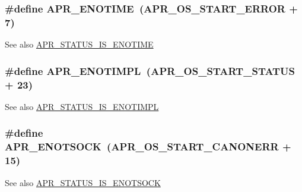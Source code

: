 \subsubsection[{\texorpdfstring{A\+P\+R\+\_\+\+E\+N\+O\+T\+I\+ME}{APR_ENOTIME}}]{\setlength{\rightskip}{0pt plus 5cm}\#define A\+P\+R\+\_\+\+E\+N\+O\+T\+I\+ME~({\bf A\+P\+R\+\_\+\+O\+S\+\_\+\+S\+T\+A\+R\+T\+\_\+\+E\+R\+R\+OR} + 7)}\hypertarget{group___a_p_r___error_ga7acfb436774a21ae93ff5c1b89e7c4f5}{}\label{group___a_p_r___error_ga7acfb436774a21ae93ff5c1b89e7c4f5}
\begin{DoxySeeAlso}{See also}
\hyperlink{group___a_p_r___s_t_a_t_u_s___i_s_ga20db5878fa686620b975f67734035406}{A\+P\+R\+\_\+\+S\+T\+A\+T\+U\+S\+\_\+\+I\+S\+\_\+\+E\+N\+O\+T\+I\+ME} 
\end{DoxySeeAlso}
\subsubsection[{\texorpdfstring{A\+P\+R\+\_\+\+E\+N\+O\+T\+I\+M\+PL}{APR_ENOTIMPL}}]{\setlength{\rightskip}{0pt plus 5cm}\#define A\+P\+R\+\_\+\+E\+N\+O\+T\+I\+M\+PL~({\bf A\+P\+R\+\_\+\+O\+S\+\_\+\+S\+T\+A\+R\+T\+\_\+\+S\+T\+A\+T\+US} + 23)}\hypertarget{group___a_p_r___error_ga939ddb834a30bc9a5a0a329b13000161}{}\label{group___a_p_r___error_ga939ddb834a30bc9a5a0a329b13000161}
\begin{DoxySeeAlso}{See also}
\hyperlink{group___a_p_r___s_t_a_t_u_s___i_s_gaacb876d49ae81874fc4d48bfa5fea85d}{A\+P\+R\+\_\+\+S\+T\+A\+T\+U\+S\+\_\+\+I\+S\+\_\+\+E\+N\+O\+T\+I\+M\+PL} 
\end{DoxySeeAlso}
\subsubsection[{\texorpdfstring{A\+P\+R\+\_\+\+E\+N\+O\+T\+S\+O\+CK}{APR_ENOTSOCK}}]{\setlength{\rightskip}{0pt plus 5cm}\#define A\+P\+R\+\_\+\+E\+N\+O\+T\+S\+O\+CK~({\bf A\+P\+R\+\_\+\+O\+S\+\_\+\+S\+T\+A\+R\+T\+\_\+\+C\+A\+N\+O\+N\+E\+RR} + 15)}\hypertarget{group___a_p_r___error_gad456312527050c661dc19a8f17a0f0ef}{}\label{group___a_p_r___error_gad456312527050c661dc19a8f17a0f0ef}
\begin{DoxySeeAlso}{See also}
\hyperlink{group___a_p_r___s_t_a_t_u_s___i_s_gab977261717e4119cf6d649592a33436a}{A\+P\+R\+\_\+\+S\+T\+A\+T\+U\+S\+\_\+\+I\+S\+\_\+\+E\+N\+O\+T\+S\+O\+CK} 
\end{DoxySeeAlso}
